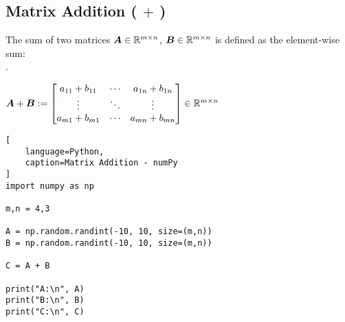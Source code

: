 \subsection{Matrix Addition ( $+$ )  \cite{mfml/book/mml/Deisenroth-Faisal-Ong}}

The sum of two matrices $\bm{A} \in \mathbb{R}^{m\times n}$, $\bm{B} \in \mathbb{R}^{m\times n}$ is defined as the element-wise sum:\\
. \hfill
\begin{customArrayStretch}{2}
$
    \bm{A} + \bm{B}
    := \begin{bmatrix}
        a_{11} + b_{11} &   \cdots  &  a_{1n} + b_{1n} \\
        \vdots          &   \ddots  &   \vdots  \\
        a_{m1} + b_{m1} &   \cdots  &  a_{mn} + b_{mn} \\
    \end{bmatrix}
    \in \mathbb{R}^{m\times n}
$
\end{customArrayStretch}
\hfill \cite{mfml/book/mml/Deisenroth-Faisal-Ong}







\begin{lstlisting}[
    language=Python,
    caption=Matrix Addition - numPy
]
import numpy as np

m,n = 4,3

A = np.random.randint(-10, 10, size=(m,n))
B = np.random.randint(-10, 10, size=(m,n))

C = A + B

print("A:\n", A)
print("B:\n", B)
print("C:\n", C)
\end{lstlisting}








